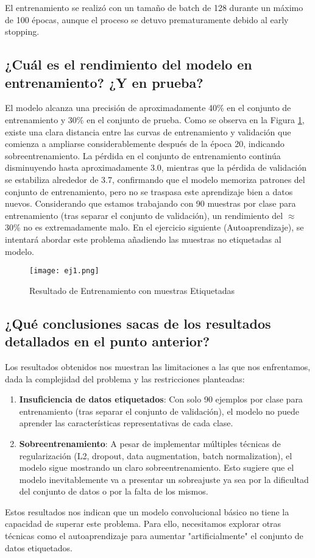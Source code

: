 \documentclass{article}
\begin{document}
El entrenamiento se realizó con un tamaño de batch de 128 durante un máximo de 100 épocas, aunque el proceso se detuvo prematuramente debido al early stopping.

\subsection{¿Cuál es el rendimiento del modelo en entrenamiento? ¿Y en prueba?}
El modelo alcanza una precisión de aproximadamente 40\% en el conjunto de entrenamiento y 30\% en el conjunto de prueba. Como se observa en la Figura \ref{model-performance-ej1}, existe una clara distancia entre las curvas de entrenamiento y validación que comienza a ampliarse considerablemente después de la época 20, indicando sobreentrenamiento.
La pérdida en el conjunto de entrenamiento continúa disminuyendo hasta aproximadamente 3.0, mientras que la pérdida de validación se estabiliza alrededor de 3.7, confirmando que el modelo memoriza patrones del conjunto de entrenamiento, pero no se traspasa este aprendizaje bien a datos nuevos.
Considerando que estamos trabajando con 90 muestras por clase para entrenamiento (tras separar el conjunto de validación), un rendimiento del $\approx$30\% no es extremadamente malo. En el ejercicio siguiente (Autoaprendizaje), se intentará abordar este problema añadiendo las muestras no etiquetadas al modelo.

\begin{figure}[h]
\centering
\texttt{[image: ej1.png]}
\caption{Resultado de Entrenamiento con muestras Etiquetadas}
\label{model-performance-ej1}
\end{figure}


\subsection{¿Qué conclusiones sacas de los resultados detallados en el punto anterior?}
Los resultados obtenidos nos muestran las limitaciones a las que nos enfrentamos, dada la complejidad del problema y las restricciones planteadas:
\begin{enumerate}
\item \textbf{Insuficiencia de datos etiquetados}: Con solo 90 ejemplos por clase para entrenamiento (tras separar el conjunto de validación), el modelo no puede aprender las características representativas de cada clase. 

\item \textbf{Sobreentrenamiento}: A pesar de implementar múltiples técnicas de regularización (L2, dropout, data augmentation, batch normalization), el modelo sigue mostrando un claro sobreentrenamiento. Esto sugiere que el modelo inevitablemente va a presentar un sobreajuste ya sea por la dificultad del conjunto de datos o por la falta de los mismos.

\end{enumerate}
Estos resultados nos indican que un modelo convolucional básico no tiene la capacidad de superar este problema. Para ello, necesitamos explorar otras técnicas como el autoaprendizaje para aumentar "artificialmente" el conjunto de datos etiquetados.
\end{document}
